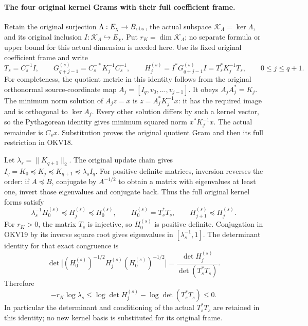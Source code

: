 \documentclass[11pt,a4paper]{article}
\begin{document}
\paragraph{The four original kernel Grams with their full coefficient frame.}
Retain the original surjection $\Lambda:E_\chi\to B_{\rm obs}$,
the actual subspace $\mathcal K_\Lambda=\ker\Lambda$, and its original
inclusion $I:\mathcal K_\Lambda\hookrightarrow E_\chi$. Put
$r_K=\dim\mathcal K_\Lambda$; no separate formula or upper bound
for this actual dimension is needed here. Use its fixed original
coefficient frame and write
\[
 T_s=C_s^{-1}I,\qquad
 G_{q+j-1}^{(s)}=C_s^{-*}K_j^{-1}C_s^{-1},\qquad
 H_j^{(s)}=I^*G_{q+j-1}^{(s)}I=T_s^*K_j^{-1}T_s,
             \qquad0\le j\le q+1.
 \tag{OKV18}
\]
For completeness, the quotient metric in this identity follows from
the original orthonormal source-coordinate map
$A_j=[I_q,v_0,\ldots,v_{j-1}]$.
It obeys $A_jA_j^*=K_j$. The minimum norm solution of $A_jz=x$
is $z=A_j^*K_j^{-1}x$: it has the required image and is orthogonal
to $\ker A_j$. Every other solution differs by such a kernel vector,
so the Pythagorean identity gives minimum squared norm $x^*K_j^{-1}x$.
The actual remainder is $C_sx$. Substitution proves the original
quotient Gram and then its full restriction in OKV18.

Let $\lambda_s=\|K_{q+1}\|_2$. The original update chain gives
$I_q=K_0\preceq K_j\preceq K_{q+1}\preceq\lambda_s I_q$.
For positive definite matrices, inversion reverses the order:
if $A\preceq B$, conjugate by $A^{-1/2}$ to obtain a matrix
with eigenvalues at least one, invert those eigenvalues and conjugate
back. Thus the full original kernel forms satisfy
\[
 \lambda_s^{-1}H_0^{(s)}\preceq H_j^{(s)}\preceq H_0^{(s)},
 \qquad H_0^{(s)}=T_s^*T_s,
 \qquad H_{j+1}^{(s)}\preceq H_j^{(s)}.
 \tag{OKV19}
\]
For $r_K>0$, the matrix $T_s$ is injective, so $H_0^{(s)}$ is
positive definite. Conjugation in OKV19 by its inverse square root
gives eigenvalues in $[\lambda_s^{-1},1]$. The determinant identity
for that exact congruence is
\[
 \det\bigl[(H_0^{(s)})^{-1/2}H_j^{(s)}(H_0^{(s)})^{-1/2}\bigr]
       =\frac{\det H_j^{(s)}}{\det(T_s^*T_s)}.
\]
Therefore
\[
 -r_K\log\lambda_s
 \le\log\det H_j^{(s)}-\log\det(T_s^*T_s)\le0.
 \tag{OKV20}
\]
In particular the determinant and conditioning of the actual
$T_s^*T_s$ are retained in this identity; no new kernel basis is
substituted for its original frame.
\end{document}
